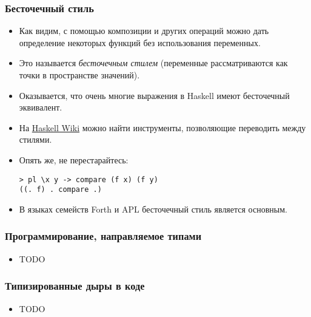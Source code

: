 \documentclass[10pt]{beamer}
\begin{document}
\begin{frame}[fragile]
\frametitle{Бесточечный стиль}
\begin{itemize}
    \item Как видим, с помощью композиции и других операций можно дать определение некоторых функций без использования переменных.
    \item Это называется \emph{бесточечным стилем} (переменные рассматриваются как точки в пространстве значений).\pause
    \item Оказывается, что очень многие выражения в Haskell имеют бесточечный эквивалент.
    \item На \href{https://wiki.haskell.org/Pointfree}{Haskell Wiki} можно найти инструменты, позволяющие переводить между стилями.
    \item Опять же, не перестарайтесь:
\begin{lstlisting}
> pl \x y -> compare (f x) (f y)
((. f) . compare .)
\end{lstlisting}\pause
    \item В языках семейств Forth и APL бесточечный стиль является основным.
\end{itemize}
\end{frame}

\begin{frame}[fragile]
\frametitle{Программирование, направляемое типами}
\begin{itemize}
    \item TODO
\end{itemize}
\end{frame}

\begin{frame}[fragile]
\frametitle{Типизированные дыры в коде}
\begin{itemize}
    \item TODO
\end{itemize}
\end{frame}
\end{document}

